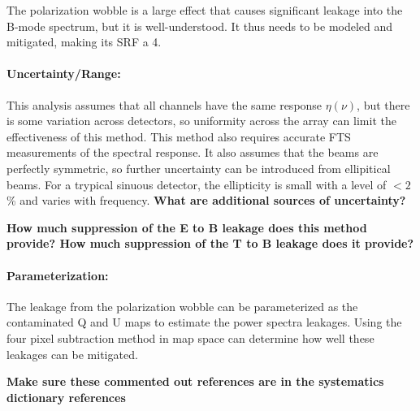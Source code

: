The polarization wobble is a large effect that causes significant leakage into the B-mode spectrum, but it is well-understood. It thus needs to be modeled and mitigated, making its SRF a 4.

\paragraph{Uncertainty/Range:}
This analysis assumes that all channels have the same response $\eta(\nu)$, but there is some variation across detectors, so uniformity across the array can limit the effectiveness of this method. This method also requires accurate FTS measurements of the spectral response. It also assumes that the beams are perfectly symmetric, so further uncertainty can be introduced from ellipitical beams. For a trypical sinuous detector, the ellipticity is small with a level of $<2$\% and varies with frequency. \textbf{What are additional sources of uncertainty?}

\textbf{How much suppression of the E to B leakage does this method provide? How much suppression of the T to B leakage does it provide?}

\paragraph{Parameterization:}
The leakage from the polarization wobble can be parameterized as the contaminated Q and U maps to estimate the power spectra leakages. Using the four pixel subtraction method in map space can determine how well these leakages can be mitigated.

\textbf{Make sure these commented out references are in the systematics dictionary references}
